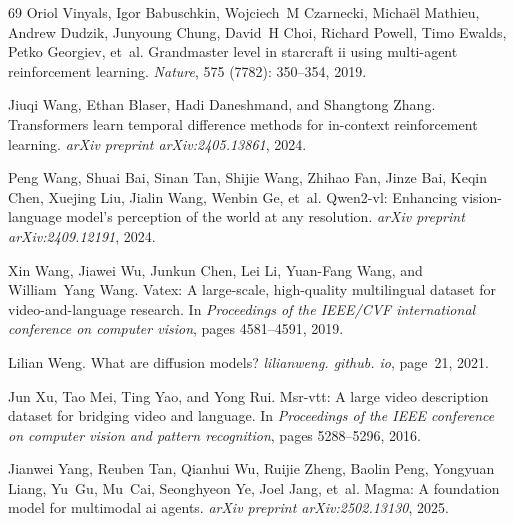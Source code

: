 \begin{thebibliography}{69}
Oriol Vinyals, Igor Babuschkin, Wojciech~M Czarnecki, Micha{\"e}l Mathieu, Andrew Dudzik, Junyoung Chung, David~H Choi, Richard Powell, Timo Ewalds, Petko Georgiev, et~al.
\newblock Grandmaster level in starcraft ii using multi-agent reinforcement learning.
\newblock \emph{Nature}, 575 (7782): 350--354, 2019.

Jiuqi Wang, Ethan Blaser, Hadi Daneshmand, and Shangtong Zhang.
\newblock Transformers learn temporal difference methods for in-context reinforcement learning.
\newblock \emph{arXiv preprint arXiv:2405.13861}, 2024{}.

Peng Wang, Shuai Bai, Sinan Tan, Shijie Wang, Zhihao Fan, Jinze Bai, Keqin Chen, Xuejing Liu, Jialin Wang, Wenbin Ge, et~al.
\newblock Qwen2-vl: Enhancing vision-language model's perception of the world at any resolution.
\newblock \emph{arXiv preprint arXiv:2409.12191}, 2024{}.

Xin Wang, Jiawei Wu, Junkun Chen, Lei Li, Yuan-Fang Wang, and William~Yang Wang.
\newblock Vatex: A large-scale, high-quality multilingual dataset for video-and-language research.
\newblock In \emph{Proceedings of the IEEE/CVF international conference on computer vision}, pages 4581--4591, 2019.

Lilian Weng.
\newblock What are diffusion models?
\newblock \emph{lilianweng. github. io}, page~21, 2021.

Jun Xu, Tao Mei, Ting Yao, and Yong Rui.
\newblock Msr-vtt: A large video description dataset for bridging video and language.
\newblock In \emph{Proceedings of the IEEE conference on computer vision and pattern recognition}, pages 5288--5296, 2016.

Jianwei Yang, Reuben Tan, Qianhui Wu, Ruijie Zheng, Baolin Peng, Yongyuan Liang, Yu~Gu, Mu~Cai, Seonghyeon Ye, Joel Jang, et~al.
\newblock Magma: A foundation model for multimodal ai agents.
\newblock \emph{arXiv preprint arXiv:2502.13130}, 2025.


\end{thebibliography}
